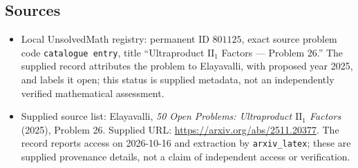 \documentclass[11pt]{article}
\begin{document}
\subsection{Sources}
\begin{itemize}
\item Local UnsolvedMath registry: permanent ID \(801125\), exact source problem code \texttt{catalogue entry}, title ``Ultraproduct \(\mathrm{II}_1\) Factors --- Problem 26.'' The supplied record attributes the problem to Elayavalli, with proposed year 2025, and labels it open; this status is supplied metadata, not an independently verified mathematical assessment.
\item Supplied source list: Elayavalli, \emph{50 Open Problems: Ultraproduct \(\mathrm{II}_1\) Factors} (2025), Problem 26. Supplied URL: \url{https://arxiv.org/abs/2511.20377}. The record reports access on 2026-10-16 and extraction by \texttt{arxiv\_latex}; these are supplied provenance details, not a claim of independent access or verification.
\end{itemize}
\end{document}
